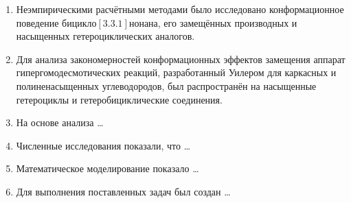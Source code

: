 \begin{enumerate}
  \item Неэмпирическими расчётными методами было исследовано конформационное поведение бицикло$[3.3.1]$нонана, его замещённых производных и насыщенных гетероциклических аналогов.
  \item Для анализа закономерностей конформационных эффектов замещения аппарат гипергомодесмотических реакций, разработанный Уилером для каркасных и полиненасыщенных углеводородов, был распространён на насыщенные гетероциклы и гетеробициклические соединения.
  \item На основе анализа \ldots
  \item Численные исследования показали, что \ldots
  \item Математическое моделирование показало \ldots
  \item Для выполнения поставленных задач был создан \ldots
\end{enumerate}
